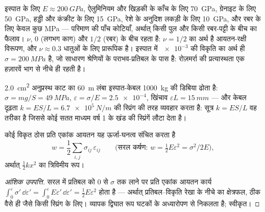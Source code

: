 \begin{remark}[परिमाण की कोटियाँ]\label{rem:b3:continuum-elasticity:orders}
इस्पात के लिए $E \approx \qty{200}{GPa}$, ऐलुमिनियम और खिड़की के काँच
के लिए \qty{70}{GPa}, ग्रेनाइट के लिए \qty{50}{GPa}, हड्डी और
कंक्रीट के लिए \qty{15}{GPa}, रेशे के अनुदिश लकड़ी के लिए
\qty{10}{GPa}, और रबर के लिए केवल कुछ MPa --- परिमाण की पाँच कोटियाँ,
अर्थात् किसी पुल और किसी रबर-पट्टी के बीच का फैलाव। $\nu$, $0$ (लगभग
काग) और $1/2$ (रबर) के बीच रहता है: $\nu = 1/2$ का अर्थ है
आयतन-रक्षी विरूपण, और $\nu \approx 0.3$ धातुओं के लिए प्रारूपिक है।
इस्पात में $\num{e-3}$ की विकृति का अर्थ ही
$\sigma = \qty{200}{MPa}$ है, जो साधारण श्रेणियों के पराभव-प्रतिबल के
पास है: रोज़मर्रा की प्रत्यास्थता एक हज़ारवें भाग से नीचे ही रहती है।
\end{remark}

\begin{example}[लिफ़्ट का केबल]\label{ex:b3:continuum-elasticity:cable}
\qty{2.0}{cm^2} अनुप्रस्थ काट का \qty{60}{m} लंबा इस्पात-केबल
\qty{1000}{kg} की डिबिया ढोता है: $\sigma = mg/S = \qty{49}{MPa}$, $\varepsilon =
\sigma/E = \num{2.5e-4}$, खिंचाव $\varepsilon L = \qty{15}{mm}$ ---
और केबल दृढ़ता $k = ES/L =
\qty{6.7e5}{N/m}$ की स्प्रिंग की तरह व्यवहार करता है: सूत्र $k = ES/L$
वह तरीका है जिससे कोई सतत माध्यम वर्ष 1 के खंड की स्प्रिंगें लौटा देता है।
\end{example}

\begin{proposition}[प्रत्यास्थ ऊर्जा]\label{prop:b3:continuum-elasticity:energy}
कोई विकृत ठोस प्रति एकांक आयतन यह ऊर्जा-घनत्व संचित करता है
\[
w = \frac12\sum_{i,j}\sigma_{ij}\,\varepsilon_{ij}
\qquad\text{(सरल कर्षण: } w = \tfrac12 E\varepsilon^2 =
\sigma^2/2E\text{)} ,
\]
अर्थात् $\tfrac12 kx^2$ का त्रिविमीय रूप।
\end{proposition}

\begin{proof}[आंशिक उपपत्ति]
सरल  में प्रतिबल को $0$ से $\sigma$ तक लाने पर प्रति एकांक आयतन
कार्य $\int_0^\varepsilon\sigma'\,\dd\varepsilon' =
\int_0^\varepsilon E\varepsilon'\,\dd\varepsilon' = \tfrac12
E\varepsilon^2$ होता है --- अर्थात् प्रतिबल--विकृति रेखा के नीचे का
क्षेत्रफल, ठीक वैसे ही जैसे किसी स्प्रिंग के लिए। व्यापक द्विघात रूप
घटकों के अध्यारोपण से निकलता है; स्वीकृत।
\end{proof}

